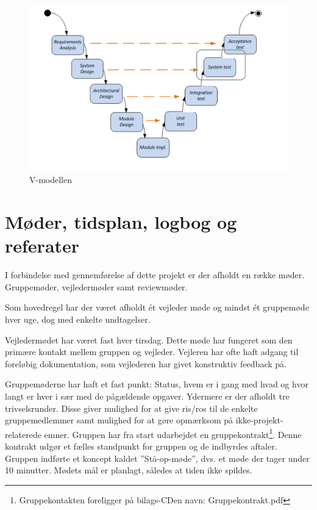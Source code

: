\begin{figure}[h]
  \centering
    \includegraphics[width=\textwidth]{Billeder/V_modellen}
    \caption{V-modellen}
    \label{fig:V_modellen}
\end{figure}

\section{Møder, tidsplan, logbog og referater}

I forbindelse med gennemførelse af dette projekt er der afholdt en række møder. Gruppemøder, vejledermøder samt reviewmøder. 

Som hovedregel har der været afholdt ét vejleder møde og mindst ét gruppemøde hver uge, dog med enkelte undtagelser. 

Vejledermødet har været fast hver tirsdag. Dette møde har fungeret som den primære kontakt mellem gruppen og vejleder. Vejleren har ofte haft adgang til foreløbig dokumentation, som vejlederen har givet konstruktiv feedback på.

Gruppemøderne har haft et fast punkt: Status, hvem er i gang med hvad og hvor langt er hver i sær med de pågældende opgaver. Ydermere er der afholdt tre trivselsrunder. Disse giver mulighed for at give ris/ros til de enkelte gruppemedlemmer samt mulighed for at gøre opmærksom på ikke-projekt-relaterede emner. 
Gruppen har fra start udarbejdet en gruppekontrakt\footnote{Gruppekontakten foreligger på bilags-CDen navn: Gruppekontrakt.pdf}. Denne kontrakt udgør et fælles standpunkt for gruppen og de indbyrdes aftaler. Gruppen indførte et koncept kaldet ''Stå-op-møde'', dvs. et møde der tager under 10 minutter. Mødets mål er planlagt, således at tiden ikke spildes. 


